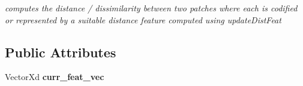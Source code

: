 \begin{DoxyCompactItemize}
\begin{DoxyCompactList}\small\item\em computes the distance / dissimilarity between two patches where each is codified or represented by a suitable distance feature computed using update\-Dist\-Feat \end{DoxyCompactList}\end{DoxyCompactItemize}
\subsection*{Public Attributes}
\begin{DoxyCompactItemize}
\item 
\hypertarget{classRIU_a1747e7678c7fbbd69ebf9f8a875c5d5b}{Vector\-Xd {\bfseries curr\-\_\-feat\-\_\-vec}}\label{classRIU_a1747e7678c7fbbd69ebf9f8a875c5d5b}

\end{DoxyCompactItemize}
